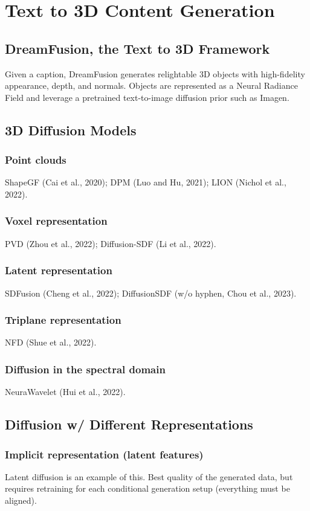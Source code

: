 \chapter{Text to 3D Content Generation}

\section{DreamFusion, the Text to 3D Framework}
Given a caption, DreamFusion generates relightable 3D objects with high-fidelity appearance, depth, and normals. Objects are represented as a Neural Radiance Field and leverage a pretrained text-to-image diffusion prior such as Imagen.
\section{3D Diffusion Models}
\subsection{Point clouds}
ShapeGF (Cai et al., 2020); DPM (Luo and Hu, 2021); LION (Nichol et al., 2022).
\subsection{Voxel representation}
PVD (Zhou et al., 2022); Diffusion-SDF (Li et al., 2022).
\subsection{Latent representation}
SDFusion (Cheng et al., 2022); DiffusionSDF (w/o hyphen, Chou et al., 2023).
\subsection{Triplane representation}
NFD (Shue et al., 2022).
\subsection{Diffusion in the spectral domain}
NeuraWavelet (Hui et al., 2022).
\section{Diffusion w/ Different Representations}
\subsection{Implicit representation (latent features)}
Latent diffusion is an example of this. Best quality of the generated data, but requires retraining for each conditional generation setup (everything must be aligned).

